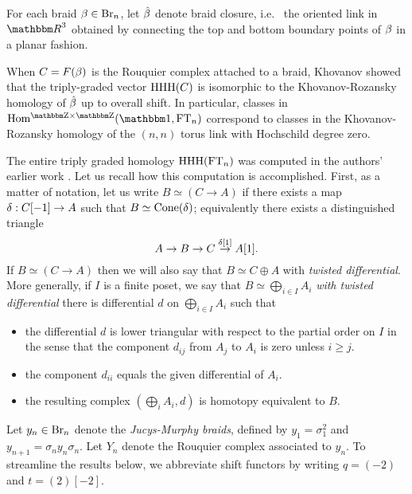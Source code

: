 For each braid $\beta\in \operatorname{Br}_n$, let $\hat{\beta}$ denote braid closure, i.e.~ the oriented link in $\R^3$ obtained by connecting the top and bottom boundary points of $\beta$ in a planar fashion. 
\begin{remark} When $C=F(\beta)$ is the Rouquier complex attached to a braid, Khovanov showed \cite{Kh07} that the triply-graded vector $\operatorname{HHH}(C)$ is isomorphic to the Khovanov-Rozansky homology of $\hat{\beta}$ up to overall shift.  In particular, classes in $\Homgg(\one,\FT_n)$ correspond to classes in the Khovanov-Rozansky homology of the $(n,n)$ torus link with Hochschild degree zero.
\end{remark}


The entire triply graded homology $\operatorname{HHH}(\operatorname{FT}_n)$ was computed in the authors' earlier work \cite{ElHog16a}.  Let us recall how this computation is accomplished.  First, as a matter of notation, let us write $B\simeq (C \rightarrow A)$ if there exists a map $\delta:C[-1]\rightarrow A$ such that $B\simeq \operatorname{Cone}(\delta)$; equivalently there exists a distinguished triangle
\[
A\rightarrow B\rightarrow C\buildrel \d[1]\over \rightarrow A[1].
\]
If $B\simeq (C\rightarrow A)$ then we will also say that $B\simeq C\oplus A$ with \emph{twisted differential}.  More generally, if $I$ is a finite poset, we say that $B\simeq \bigoplus_{i\in I}A_i$ \emph{with twisted differential} there is differential $d$ on $\bigoplus_{i\in I} A_i$ such that
\begin{itemize}
\item the differential $d$ is lower triangular with respect to the partial order on $I$ in the sense that the component $d_{ij}$ from $A_j$ to $A_i$ is zero unless $i\geq j$.
\item the component $d_{ii}$ equals the given differential of $A_i$.
\item the resulting complex $(\bigoplus_i A_i, d)$ is homotopy equivalent to $B$.
\end{itemize}

Let $y_n\in \operatorname{Br}_n$ denote the \emph{Jucys-Murphy braids}, defined by $y_1=\sigma_1^2$ and $y_{n+1} = \sigma_n y_n\sigma_n$.  Let $Y_n$ denote the Rouquier complex associated to $y_n$. To streamline the results below, we abbreviate shift functors by writing $q=(-2)$ and $t=(2)[-2]$.

